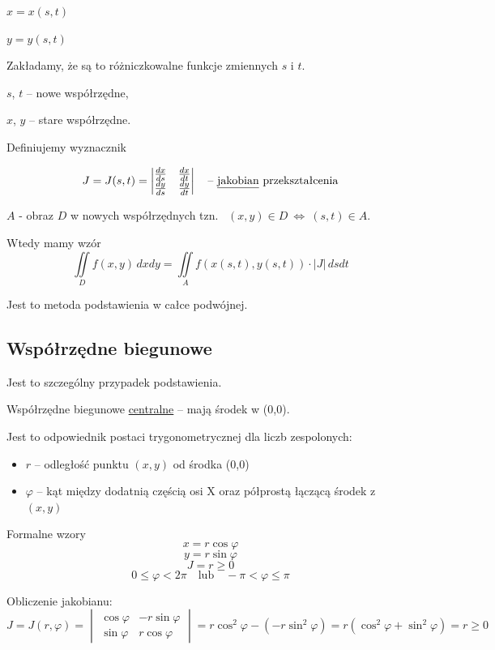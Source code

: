 $ x = x(s,t) $

$ y = y(s,t) $

Zakładamy, że są to różniczkowalne funkcje zmiennych $s$ i $t$.

$s$, $t$ -- nowe współrzędne,

$x$, $y$ -- stare współrzędne.

Definiujemy wyznacznik

\[ J = J(s,t) = \begin{vmatrix}
    \frac{dx}{ds} & \frac{dx}{dt} \\
    \frac{dy}{ds} & \frac{dy}{dt}
\end{vmatrix} \textrm{\quad -- \underline{jakobian} przekształcenia} \]

$A$ - obraz $D$ w nowych współrzędnych tzn. \ $ (x,y) \in D \ \Leftrightarrow \ (s,t) \in A $.

Wtedy mamy wzór
\[ \iint\limits_D f(x,y) \, dxdy = \iint\limits_A f(x(s,t), y(s,t)) \cdot |J|\, dsdt \]

Jest to metoda podstawienia w całce podwójnej.


\subsection{Współrzędne biegunowe}

Jest to szczególny przypadek podstawienia.

Współrzędne biegunowe \underline{centralne} -- mają środek w (0,0).

Jest to odpowiednik postaci trygonometrycznej dla liczb zespolonych:
\begin{itemize}
    \item $r$ -- odległość punktu $(x,y)$ od środka (0,0)
    \item $\varphi$ -- kąt między dodatnią częścią osi X oraz półprostą łączącą środek z $(x,y)$
\end{itemize}

\begin{tw}{Formalne wzory}
\[ x = r \cos \varphi \]
\[ y = r \sin \varphi \]
\[ J = r \geq 0 \]
\[ 0 \leq \varphi < 2 \pi \quad \textrm{lub} \quad -\pi < \varphi \leq \pi \]

Obliczenie jakobianu:
\[ J = J(r, \varphi) = \begin{vmatrix}
    \cos \varphi & -r \sin \varphi \\
    \sin \varphi & r \cos \varphi
\end{vmatrix} = r \cos^2 \varphi - (- r \sin^2 \varphi) = r(\cos^2 \varphi + \sin^2 \varphi) = r \geq 0 \]

\end{tw}

